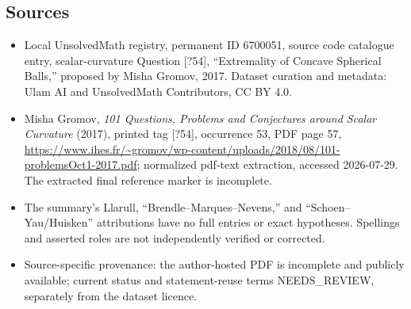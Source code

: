 \documentclass[11pt]{article}
\begin{document}
\subsection{Sources}
\begin{itemize}
\item Local UnsolvedMath registry, permanent ID 6700051, source code catalogue entry, scalar-curvature Question [?54], ``Extremality of Concave Spherical Balls,'' proposed by Misha Gromov, 2017. Dataset curation and metadata: Ulam AI and UnsolvedMath Contributors, CC BY 4.0.
\item Misha Gromov, \emph{101 Questions, Problems and Conjectures around Scalar Curvature} (2017), printed tag [?54], occurrence 53, PDF page 57, \url{https://www.ihes.fr/~gromov/wp-content/uploads/2018/08/101-problemsOct1-2017.pdf}; normalized pdf-text extraction, accessed 2026-07-29. The extracted final reference marker is incomplete.
\item The summary's Llarull, ``Brendle--Marques--Nevens,'' and ``Schoen--Yau/Huisken'' attributions have no full entries or exact hypotheses. Spellings and asserted roles are not independently verified or corrected.
\item Source-specific provenance: the author-hosted PDF is incomplete and publicly available; current status and statement-reuse terms NEEDS\_REVIEW, separately from the dataset licence.
\end{itemize}
\end{document}
